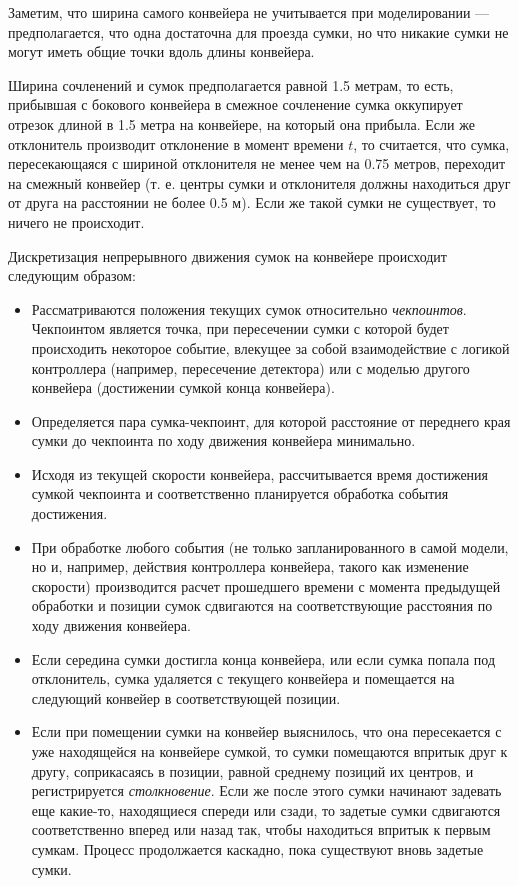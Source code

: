 \documentclass[specification,annotation,times]{itmo-student-thesis}
\theoremstyle{definition}
\begin{document}
Заметим, что ширина самого конвейера не учитывается при моделировании ---
предполагается, что одна достаточна для проезда сумки, но что никакие сумки не
могут иметь общие точки вдоль длины конвейера.

Ширина сочленений и сумок предполагается равной 1.5 метрам, то есть, прибывшая с
бокового конвейера в смежное сочленение сумка оккупирует отрезок длиной в 1.5
метра на конвейере, на который она прибыла. Если же отклонитель производит
отклонение в момент времени $t$, то считается, что сумка, пересекающаяся с
шириной отклонителя не менее чем на 0.75 метров, переходит на смежный конвейер
(т. е. центры сумки и отклонителя должны находиться друг от друга на расстоянии
не более 0.5 м). Если же такой сумки не существует, то ничего не происходит.

Дискретизация непрерывного движения сумок на конвейере происходит следующим
образом:
\begin{itemize}
\item Рассматриваются положения текущих сумок относительно \textit{чекпоинтов}.
  Чекпоинтом является точка, при пересечении сумки с которой будет происходить
  некоторое событие, влекущее за собой взаимодействие с логикой контроллера
  (например, пересечение детектора) или с моделью другого конвейера (достижении
  сумкой конца конвейера).
\item Определяется пара сумка-чекпоинт, для которой расстояние от переднего края
  сумки до чекпоинта по ходу движения конвейера минимально.
\item Исходя из текущей скорости конвейера, рассчитывается время достижения
  сумкой чекпоинта и соответственно планируется обработка события достижения.
\item При обработке любого события (не только запланированного в самой модели,
  но и, например, действия контроллера конвейера, такого как изменение скорости)
  производится расчет прошедшего времени с момента предыдущей обработки и
  позиции сумок сдвигаются на соответствующие расстояния по ходу движения
  конвейера.
\item Если середина сумки достигла конца конвейера, или если сумка попала под
  отклонитель, сумка удаляется с текущего конвейера и помещается на следующий
  конвейер в соответствующей позиции.
\item Если при помещении сумки на конвейер выяснилось, что она пересекается с
  уже находящейся на конвейере сумкой, то сумки помещаются впритык друг к другу,
  соприкасаясь в позиции, равной среднему позиций их центров, и регистрируется
  \textit{столкновение}. Если же после этого сумки начинают задевать еще
  какие-то, находящиеся спереди или сзади, то задетые сумки сдвигаются
  соответственно вперед или назад так, чтобы находиться впритык к первым сумкам.
  Процесс продолжается каскадно, пока существуют вновь задетые сумки.
\end{itemize}
\end{document}
